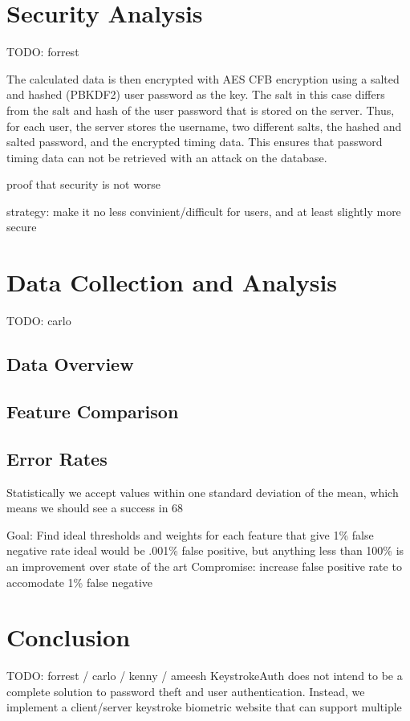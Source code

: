 \documentclass{article}
\begin{document}
\section{Security Analysis}
TODO: forrest

The calculated data is then encrypted with AES CFB encryption using a salted and hashed (PBKDF2) user password as the key. The salt in this case differs from the salt and hash of the user password that is stored on the server. Thus, for each user, the server stores the username, two different salts, the hashed and salted password, and the encrypted timing data. This ensures that password timing data can not be retrieved with an attack on the database.


proof that security is not worse

strategy: make it no less convinient/difficult for users, and at least slightly more secure

\section{Data Collection and Analysis}
TODO: carlo

\subsection{Data Overview}

\subsection{Feature Comparison} %


\subsection{Error Rates}    %
Statistically we accept values within one standard deviation of the mean, which means we should see a success in 68%

Goal: Find ideal thresholds and weights for each feature that give 1\% false negative rate
ideal would be  .001\% false positive, but anything less than 100\% is an improvement over state of the art
Compromise: increase false positive rate to accomodate 1\% false negative

\section{Conclusion}
TODO: forrest / carlo / kenny / ameesh
KeystrokeAuth does not intend to be a complete solution to password theft and user authentication. Instead, we implement a client/server keystroke biometric website that can support multiple
\end{document}

